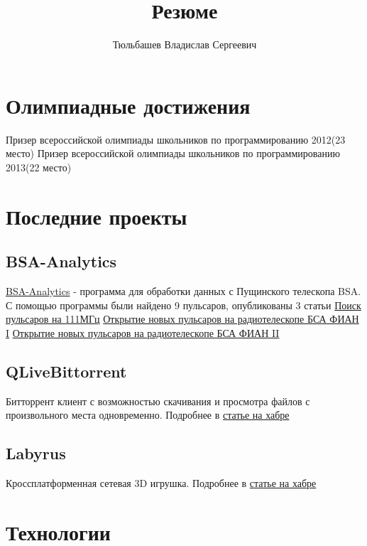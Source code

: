 \documentclass[a4paper, 8pt]{article}
\title{\Huge Резюме}
\author{\Huge Тюльбашев Владислав Сергеевич}
\begin{document}
\maketitle
\section{Олимпиадные достижения} {
	Призер всероссийской олимпиады школьников по программированию 2012(23 место) \newline
	Призер всероссийской олимпиады школьников по программированию 2013(22 место)
}

\section{Последние проекты} {
	\subsection{BSA-Analytics} {
		\href{https://blog.vtyulb.ru/projects/BSA-Analytics}{BSA-Analytics} - программа для обработки данных с 
		Пущинского телескопа BSA. С помощью программы были найдено 9 пульсаров, опубликованы 3 статьи \newline
		\href{http://adsabs.harvard.edu/abs/2016ARep...60..220T}{Поиск пульсаров на 111МГц} \newline
		\href{http://comet.sai.msu.ru/~gmr/AC/AC1624.pdf}{Открытие новых пульсаров на радиотелескопе БСА ФИАН I} \newline
		\href{http://comet.sai.msu.ru/~gmr/AC/AC1625.pdf}{Открытие новых пульсаров на радиотелескопе БСА ФИАН II
	}
	
	\subsection{QLiveBittorrent} {
		Битторрент клиент с возможностью скачивания и просмотра файлов с произвольного места одновременно.
		Подробнее в \href{http://habrahabr.ru/post/185770/}{статье на хабре}
	}
	
	\subsection{Labyrus} {
		Кроссплатформенная сетевая 3D игрушка.
		Подробнее в \href{http://habrahabr.ru/post/177807}{статье на хабре}
	}
}

\section{Технологии} {
}}
\end{document}
